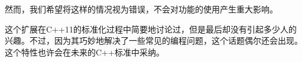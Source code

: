 然而，我们希望将这样的情况视为错误，不会对功能的使用产生重大影响。

这个扩展在C++11的标准化过程中简要地讨论过，但是最后却没有引起多少人的兴趣。不过，因为其巧妙地解决了一些常见的编程问题，这个话题偶尔还会出现。这个特性也许会在未来的C++标准中采纳。






















